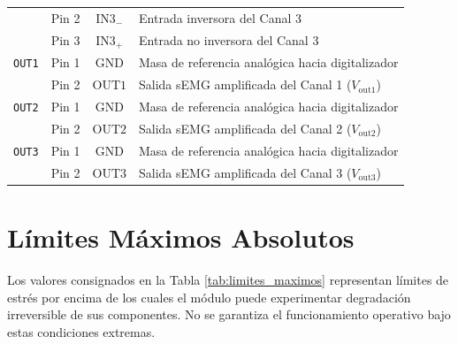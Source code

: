 \documentclass[10pt,a4paper]{article}
\begin{document}
\begin{table}[H]
\begin{tabular}{llcl}
                       & Pin 2 & $\text{IN3}_-$ & Entrada inversora del Canal 3 \\
                       & Pin 3 & $\text{IN3}_+$ & Entrada no inversora del Canal 3 \\
        \midrule
        \texttt{OUT1}& Pin 1 & $\text{GND}$ & Masa de referencia analógica hacia digitalizador \\
                     & Pin 2 & $\text{OUT1}$ & Salida sEMG amplificada del Canal 1 ($V_{\text{out1}}$) \\
        \midrule
        \texttt{OUT2}& Pin 1 & $\text{GND}$ & Masa de referencia analógica hacia digitalizador \\
                     & Pin 2 & $\text{OUT2}$ & Salida sEMG amplificada del Canal 2 ($V_{\text{out2}}$) \\
        \midrule
        \texttt{OUT3}& Pin 1 & $\text{GND}$ & Masa de referencia analógica hacia digitalizador \\
                     & Pin 2 & $\text{OUT3}$ & Salida sEMG amplificada del Canal 3 ($V_{\text{out3}}$) \\
        \bottomrule
    \end{tabular}
\end{table}

\clearpage

\section{Límites Máximos Absolutos}

Los valores consignados en la Tabla \ref{tab:limites_maximos} representan límites de estrés por encima de los cuales el módulo puede experimentar degradación irreversible de sus componentes. No se garantiza el funcionamiento operativo bajo estas condiciones extremas.
\end{document}
